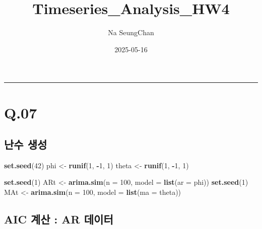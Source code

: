 \documentclass[
]{article}
\title{Timeseries\_Analysis\_HW4}
\author{Na SeungChan}
\date{2025-05-16}
\newenvironment{Shaded}{\begin{snugshade}}{\end{snugshade}}
\newcommand{\AttributeTok}[1]{\textcolor[rgb]{0.13,0.29,0.53}{#1}}
\newcommand{\CommentTok}[1]{\textcolor[rgb]{0.56,0.35,0.01}{\textit{#1}}}
\newcommand{\DecValTok}[1]{\textcolor[rgb]{0.00,0.00,0.81}{#1}}
\newcommand{\FunctionTok}[1]{\textcolor[rgb]{0.13,0.29,0.53}{\textbf{#1}}}
\newcommand{\NormalTok}[1]{#1}
\newcommand{\OtherTok}[1]{\textcolor[rgb]{0.56,0.35,0.01}{#1}}
\newcommand{\SpecialCharTok}[1]{\textcolor[rgb]{0.81,0.36,0.00}{\textbf{#1}}}
\begin{document}
\maketitle

\begin{center}\rule{0.5\linewidth}{0.5pt}\end{center}

\section{Q.07}\label{q.07}

\subsection{난수 생성}\label{uxb09cuxc218-uxc0dduxc131}

\begin{Shaded}
\begin{Highlighting}[]
\FunctionTok{set.seed}\NormalTok{(}\DecValTok{42}\NormalTok{)}
\NormalTok{phi }\OtherTok{\textless{}{-}} \FunctionTok{runif}\NormalTok{(}\DecValTok{1}\NormalTok{, }\SpecialCharTok{{-}}\DecValTok{1}\NormalTok{, }\DecValTok{1}\NormalTok{)}
\NormalTok{theta }\OtherTok{\textless{}{-}} \FunctionTok{runif}\NormalTok{(}\DecValTok{1}\NormalTok{, }\SpecialCharTok{{-}}\DecValTok{1}\NormalTok{, }\DecValTok{1}\NormalTok{)}

\FunctionTok{set.seed}\NormalTok{(}\DecValTok{1}\NormalTok{)}
\NormalTok{ARt }\OtherTok{\textless{}{-}} \FunctionTok{arima.sim}\NormalTok{(}\AttributeTok{n =} \DecValTok{100}\NormalTok{, }\AttributeTok{model =} \FunctionTok{list}\NormalTok{(}\AttributeTok{ar =}\NormalTok{ phi))}
\FunctionTok{set.seed}\NormalTok{(}\DecValTok{1}\NormalTok{)}
\NormalTok{MAt }\OtherTok{\textless{}{-}} \FunctionTok{arima.sim}\NormalTok{(}\AttributeTok{n =} \DecValTok{100}\NormalTok{, }\AttributeTok{model =} \FunctionTok{list}\NormalTok{(}\AttributeTok{ma =}\NormalTok{ theta))}
\end{Highlighting}
\end{Shaded}

\subsection{AIC 계산 : AR
데이터}\label{aic-uxacc4uxc0b0-ar-uxb370uxc774uxd130}

\begin{Shaded}
\end{Shaded}
\end{document}

